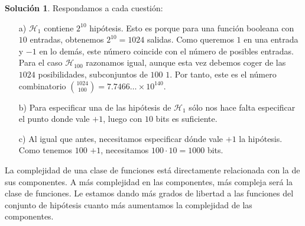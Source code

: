 \documentclass[a4paper, 11pt]{article}
\theoremstyle{definition}
\newtheorem*{solucion}{Solución}
\begin{document}
  \begin{solucion}
    Respondamos a cada cuestión:

    \begin{enumerate}
      \item[a)] $\mathcal{H}_1$ contiene $2^{10}$ hipótesis. Esto es porque para una función booleana con $10$ entradas, obtenemos $2^{10}=1024$ salidas. Como queremos $1$ en una entrada y $-1$ en lo demás, este número coincide con el número de posibles entradas. Para el caso $\mathcal{H}_{100}$ razonamos igual, aunque esta vez debemos coger de las $1024$ posibilidades, subconjuntos de $100$ $1$. Por tanto, este es el número combinatorio ${\binom{1024}{100}} = 7.7466\ldots \times 10^{140}$.
      \item[b)] Para especificar una de las hipótesis de $\mathcal{H}_1$ sólo nos hace falta especificar el punto donde vale $+1$, luego con $10$ bits es suficiente.
      \item[c)] Al igual que antes, necesitamos especificar dónde vale $+1$ la hipótesis. Como tenemos $100$ $+1$, necesitamos $100 \cdot 10 = 1000$ bits.
    \end{enumerate}

    La complejidad de una clase de funciones está directamente relacionada con la de sus componentes. A más complejidad en las componentes, más compleja será la clase de funciones. Le estamos dando más grados de libertad a las funciones del conjunto de hipótesis cuanto más aumentamos la complejidad de las componentes. 
  \end{solucion}
\end{document}
